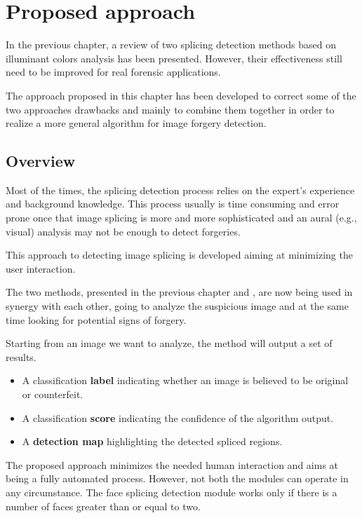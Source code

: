 \chapter{Proposed approach}

In the previous chapter, a review of two splicing detection methods based on illuminant colors analysis has been presented. However, their effectiveness still need to be improved for real forensic applications.

The approach proposed in this chapter has been developed to correct some of the two approaches drawbacks and mainly to combine them together in order to realize a more general algorithm for image forgery detection. 

\section{Overview}

Most of the times, the splicing detection process relies on the expert's experience and background knowledge. This process usually is time consuming and error prone once that image splicing is more and more sophisticated and an aural (e.g., visual) analysis may not be enough to detect forgeries.

This approach to detecting image splicing is developed aiming at minimizing the user interaction. 

The two methods, presented in the previous chapter \cite{carvalho2016illuminant} and \cite{fan2015image}, are now being used in synergy with each other, going to analyze the suspicious image and at the same time looking for potential signs of forgery.

Starting from an image we want to analyze, the method will output a set of results.
\begin{itemize}
\item A classification \textbf{label} indicating whether an image is believed to be original or counterfeit.
\item A classification \textbf{score} indicating the confidence of the algorithm output.
\item A \textbf{detection map} highlighting the detected spliced regions.
\end{itemize}

The proposed approach minimizes the needed human interaction and aims at being a fully automated process. However, not both the modules can operate in any circumstance. The face splicing detection module works only if there is a number of faces greater than or equal to two.

